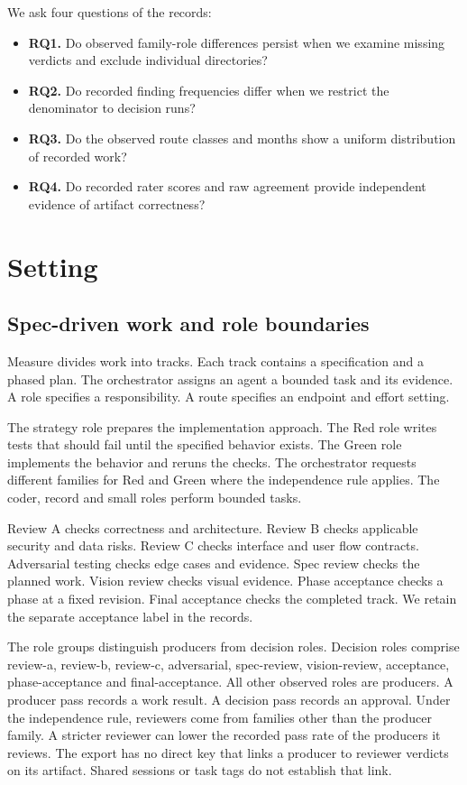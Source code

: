 \documentclass[
  10pt,
  a4paper,
]{article}
\providecommand{\tightlist}{%
  \setlength{\itemsep}{0pt}\setlength{\parskip}{0pt}}
\begin{document}
We ask four questions of the records:

\begin{itemize}
\tightlist
\item
  \textbf{RQ1.} Do observed family-role differences persist when we
  examine missing verdicts and exclude individual directories?
\item
  \textbf{RQ2.} Do recorded finding frequencies differ when we restrict
  the denominator to decision runs?
\item
  \textbf{RQ3.} Do the observed route classes and months show a uniform
  distribution of recorded work?
\item
  \textbf{RQ4.} Do recorded rater scores and raw agreement provide
  independent evidence of artifact correctness?
\end{itemize}

\section{Setting}\label{setting}

\subsection{Spec-driven work and role
boundaries}\label{spec-driven-work-and-role-boundaries}

Measure divides work into tracks. Each track contains a specification
and a phased plan. The orchestrator assigns an agent a bounded task and
its evidence. A role specifies a responsibility. A route specifies an
endpoint and effort setting.

The strategy role prepares the implementation approach. The Red role
writes tests that should fail until the specified behavior exists. The
Green role implements the behavior and reruns the checks. The
orchestrator requests different families for Red and Green where the
independence rule applies. The coder, record and small roles perform
bounded tasks.

Review A checks correctness and architecture. Review B checks applicable
security and data risks. Review C checks interface and user flow
contracts. Adversarial testing checks edge cases and evidence. Spec
review checks the planned work. Vision review checks visual evidence.
Phase acceptance checks a phase at a fixed revision. Final acceptance
checks the completed track. We retain the separate acceptance label in
the records.

The role groups distinguish producers from decision roles. Decision
roles comprise review-a, review-b, review-c, adversarial, spec-review,
vision-review, acceptance, phase-acceptance and final-acceptance. All
other observed roles are producers. A producer pass records a work
result. A decision pass records an approval. Under the independence
rule, reviewers come from families other than the producer family. A
stricter reviewer can lower the recorded pass rate of the producers it
reviews. The export has no direct key that links a producer to reviewer
verdicts on its artifact. Shared sessions or task tags do not establish
that link.
\end{document}
